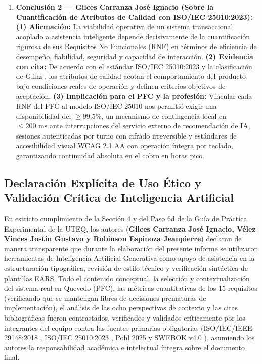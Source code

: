 \begin{enumerate}
	\item \textbf{Conclusión 2 --- Gilces Carranza José Ignacio (Sobre la Cuantificación de Atributos de Calidad con ISO/IEC 25010:2023):} \\
	\textbf{(1) Afirmación:} La viabilidad operativa de un sistema transaccional acoplado a asistencia inteligente depende decisivamente de la cuantificación rigurosa de sus Requisitos No Funcionales (RNF) en términos de eficiencia de desempeño, fiabilidad, seguridad y capacidad de interacción. \textbf{(2) Evidencia con cita:} De acuerdo con el estándar ISO/IEC 25010:2023 \cite{iso25010} y la clasificación de Glinz \cite{glinz2007nfr}, los atributos de calidad acotan el comportamiento del producto bajo condiciones reales de operación y definen criterios objetivos de aceptación. \textbf{(3) Implicación para el PFC y la profesión:} Vincular cada RNF del PFC al modelo ISO/IEC 25010 nos permitió exigir una disponibilidad del $\ge 99.5\%$, un mecanismo de contingencia local en $\le 200\text{ ms}$ ante interrupciones del servicio externo de recomendación de IA, sesiones autenticadas por turno con cifrado irreversible y estándares de accesibilidad visual WCAG 2.1 AA con operación íntegra por teclado, garantizando continuidad absoluta en el cobro en horas pico.
	
\end{enumerate}

\subsection{Declaración Explícita de Uso Ético y Validación Crítica de Inteligencia Artificial}
En estricto cumplimiento de la Sección 4 y del Paso 6d de la Guía de Práctica Experimental de la UTEQ, los autores (\textbf{Gilces Carranza José Ignacio, Vélez Vinces Jostin Gustavo y Robinson Espinoza Jeanpierre}) declaran de manera transparente que durante la elaboración del presente informe se utilizaron herramientas de Inteligencia Artificial Generativa como apoyo de asistencia en la estructuración tipográfica, revisión de estilo técnico y verificación sintáctica de plantillas EARS. Todo el contenido conceptual, la selección y contextualización del sistema real en Quevedo (PFC), las métricas cuantitativas de los 15 requisitos (verificando que se mantengan libres de decisiones prematuras de implementación), el análisis de las ocho perspectivas de contexto y las citas bibliográficas fueron contrastados, verificados y validados críticamente por los integrantes del equipo contra las fuentes primarias obligatorias (ISO/IEC/IEEE 29148:2018 \cite{ieee29148}, ISO/IEC 25010:2023 \cite{iso25010}, Pohl 2025 \cite{pohl2025} y SWEBOK v4.0 \cite{swebok2024}), asumiendo los autores la responsabilidad académica e intelectual íntegra sobre el documento final.